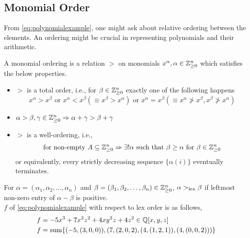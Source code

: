 \documentclass[a4paper,11pt]{article}
\begin{document}
\subsection{Monomial Order}
From \ref{eq:polynomialexample}, one might ask about relative ordering between the elements. An ordering might be crucial in representing polynomials and their arithmetic.
\begin{defn}
    A monomial ordering is a relation $>$ on monomials $x^\alpha, \alpha \in \mathbb{Z}^n_{\geq0}$ which satisfies the below properties.
    \begin{itemize}
        \item $>$ is a total order, i.e., for $\beta\in \mathbb{Z}^n_{\geq0}$ exactly one of the following happens
        \begin{equation}
            x^\alpha > x^\beta \text{ or }  x^\alpha < x^\beta (\equiv x^\beta > x^\alpha) \text{ or } x^\alpha = x^\beta (\equiv x^\alpha\ngtr x^\beta, x^\beta\ngtr x^\alpha)
        \end{equation}
        \item $\alpha>\beta, \gamma\in \mathbb{Z}^n_{\geq0}\Rightarrow \alpha+\gamma>\beta+\gamma$
        \item $>$ is a well-ordering, i.e.,
        \begin{equation}
            \text{for non-empty } A\subseteq\mathbb{Z}^n_{\geq0} \Rightarrow \exists!\alpha \text{ such that } \beta\geq\alpha \text{ for } \beta\in \mathbb{Z}^n_{\geq0}
        \end{equation}
        or equivalently, every strictly decreasing sequence $\{\alpha(i)\}$ eventually terminates.
    \end{itemize}
\end{defn}
\begin{defn}
    For $\alpha=(\alpha_1, \alpha_2, \ldots, \alpha_n)$ and $\beta=(\beta_1, \beta_2, \ldots, \beta_n) \in \mathbb{Z}^n_{\geq0}$, $\alpha>_{\text{lex}}\beta$ if leftmost non-zero entry of $\alpha-\beta$ is positive.\\
    $f$ of \ref{eq:polynomialexample} with  respect to lex order is as follows,
    \begin{equation}
    \begin{aligned}
        f&=-5x^3+7x^2z^2+4xy^2z+4z^2\in\mathbb{Q}[x,y,z]\\
        f&=\operatorname{sum}\{(-5,(3,0,0)), (7,(2,0,2), (4,(1,2,1)), (4,(0,0,2)))\}
    \end{aligned}
    \end{equation}
\end{defn}
\end{document}
